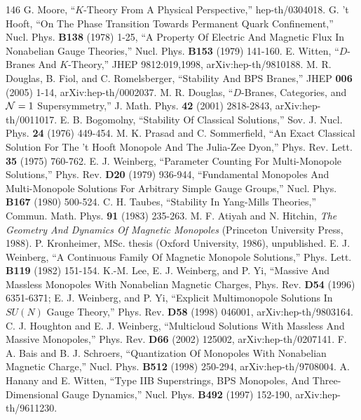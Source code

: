 \begin{thebibliography}{146}
 G. Moore, ``$K$-Theory From A Physical Perspective,'' hep-th/0304018.
 G. 't Hooft, ``On The Phase Transition Towards Permanent Quark Confinement,'' Nucl. Phys. \textbf{B138} (1978) 1-25, ``A Property Of Electric And Magnetic Flux In Nonabelian Gauge Theories,'' Nucl. Phys. \textbf{B153} (1979) 141-160.
 E. Witten, ``$D$-Branes And $K$-Theory,'' JHEP 9812:019,1998, arXiv:hep-th/9810188.
 M. R. Douglas, B. Fiol, and C. Romelsberger, ``Stability And BPS Branes,'' JHEP \textbf{006} (2005) 1-14, arXiv:hep-th/0002037.
 M. R. Douglas, ``$D$-Branes, Categories, and ${{\mathcal{N}}}=1$ Supersymmetry,'' J. Math. Phys. \textbf{42} (2001) 2818-2843, arXiv:hep-th/0011017.
 E. B. Bogomolny, ``Stability Of Classical Solutions,'' Sov. J. Nucl. Phys. \textbf{24} (1976) 449-454.
 M. K. Prasad and C. Sommerfield, ``An Exact Classical Solution For The 't Hooft Monopole And The Julia-Zee Dyon,'' Phys. Rev. Lett. \textbf{35} (1975) 760-762.
 E. J. Weinberg, ``Parameter Counting For Multi-Monopole Solutions,'' Phys. Rev. \textbf{D20} (1979) 936-944, ``Fundamental Monopoles And Multi-Monopole Solutions For Arbitrary Simple Gauge Groups,'' Nucl. Phys. \textbf{B167} (1980) 500-524.
 C. H. Taubes, ``Stability In Yang-Mills Theories,'' Commun. Math. Phys. \textbf{91} (1983) 235-263.
 M. F. Atiyah and N. Hitchin, \emph{The Geometry And Dynamics Of Magnetic Monopoles} (Princeton University Press, 1988).
 P. Kronheimer, MSc. thesis (Oxford University, 1986), unpublished.
 E. J. Weinberg, ``A Continuous Family Of Magnetic Monopole Solutions,'' Phys. Lett. \textbf{B119} (1982) 151-154.
 K.-M. Lee, E. J. Weinberg, and P. Yi, ``Massive And Massless Monopoles With Nonabelian Magnetic Charges, Phys. Rev. \textbf{D54} (1996) 6351-6371; E. J. Weinberg, and P. Yi, ``Explicit Multimonopole Solutions In $SU(N)$ Gauge Theory,'' Phys. Rev. \textbf{D58} (1998) 046001, arXiv:hep-th/9803164.
 C. J. Houghton and E. J. Weinberg, ``Multicloud Solutions With Massless And Massive Monopoles,'' Phys. Rev. \textbf{D66} (2002) 125002, arXiv:hep-th/0207141.
 F. A. Bais and B. J. Schroers, ``Quantization Of Monopoles With Nonabelian Magnetic Charge,'' Nucl. Phys. \textbf{B512} (1998) 250-294, arXiv:hep-th/9708004.
 A. Hanany and E. Witten, ``Type IIB Superstrings, BPS Monopoles, And Three-Dimensional Gauge Dynamics,'' Nucl. Phys. \textbf{B492} (1997) 152-190, arXiv:hep-th/9611230.

\end{thebibliography}
